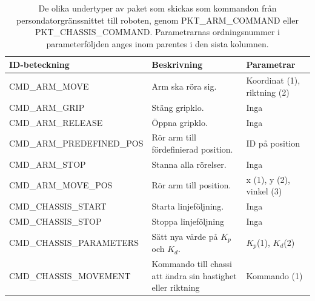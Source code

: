 \begin{table}[H]

\begin{tabularx}{\textwidth}{|l|X|X|}
\hline
\textbf{ID-beteckning} & \textbf{Beskrivning} & \textbf{Parametrar} \\ \hline
CMD\_ARM\_MOVE & Arm ska röra sig. & Koordinat (1), riktning (2) \\ \hline
CMD\_ARM\_GRIP & Stäng gripklo. & Inga \\ \hline
CMD\_ARM\_RELEASE & Öppna gripklo. & Inga \\ \hline
CMD\_ARM\_PREDEFINED\_POS & Rör arm till fördefinierad position. & ID på position \\ \hline
CMD\_ARM\_STOP & Stanna alla rörelser. & Inga \\ \hline
CMD\_ARM\_MOVE\_POS & Rör arm till position. & x (1), y (2), vinkel (3) \\ \hline
CMD\_CHASSIS\_START & Starta linjeföljning. & Inga \\ \hline
CMD\_CHASSIS\_STOP & Stoppa linjeföljning & Inga \\ \hline
CMD\_CHASSIS\_PARAMETERS & Sätt nya värde på $K_p$ och $K_d$. & $K_p$(1), $K_d$(2) \\ \hline
CMD\_CHASSIS\_MOVEMENT & Kommando till chassi att ändra sin hastighet eller riktning & Kommando (1) \\ \hline
\end{tabularx}
\caption{De olika undertyper av paket som skickas som kommandon från persondatorgränssnittet till roboten, genom PKT\_ARM\_COMMAND eller PKT\_CHASSIS\_COMMAND. Parametrarnas ordningsnummer i parameterföljden anges inom parentes i den sista kolumnen.}
\label{tab:commands}
\end{table}

